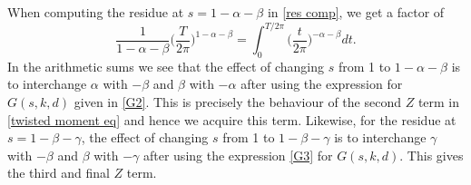 \documentclass[oneside, 12pt]{amsart}
\theoremstyle{definition}
\begin{document}
When computing the residue at $s=1-\alpha-\beta$ in \eqref{res comp}, we get a factor of 
\[
\frac{1}{1-\alpha-\beta}\bigg(\frac{T}{2\pi}\bigg)^{1-\alpha-\beta}=\int_0^{T/2\pi} \bigg(\frac{t}{2\pi}\bigg)^{-\alpha-\beta}dt.
\]
In the arithmetic sums we see that the effect of changing $s$ from 1 to $1-\alpha-\beta$ is to interchange $\alpha$ with $-\beta$ and $\beta$ with $-\alpha$ after using the expression  for $G(s, k, d)$ given in \eqref{G2}. This is precisely the behaviour of the second $Z$ term in \eqref{twisted moment eq} and hence we acquire this term. Likewise, for the residue at $s=1-\beta-\gamma$, the effect of changing $s$ from 1 to $1-\beta-\gamma$ is to interchange $\gamma$ with $-\beta$ and $\beta$ with $-\gamma$ after using the expression \eqref{G3} for $G(s, k, d)$. This gives the third and final $Z$ term.







\end{document}
